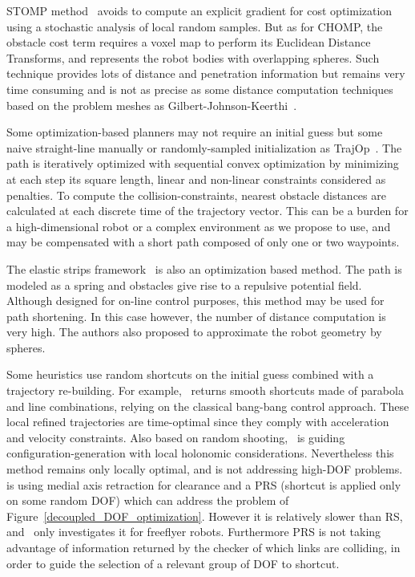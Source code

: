 \documentclass{tADR2e}
\begin{document}
STOMP method~\cite{KalakrishnanStomp} avoids to compute an 
explicit gradient for cost optimization using a stochastic analysis of local 
random samples. But as for CHOMP, the obstacle cost term requires a voxel map to 
perform its Euclidean Distance Transforms, and represents the robot bodies with 
overlapping spheres. Such technique provides lots of distance and penetration 
information but remains very time consuming and is not as precise as some 
distance computation techniques based on the problem meshes as 
Gilbert-Johnson-Keerthi~\cite{gilbertGjk}.

Some optimization-based planners may not require an initial guess but some naive 
straight-line manually or randomly-sampled initialization as 
TrajOp~\cite{SchulmanConvexOptim}. The path is iteratively optimized with 
sequential convex optimization by minimizing at each step its square length, 
linear and non-linear constraints considered as penalties. To compute the 
collision-constraints, nearest obstacle distances are calculated at each discrete 
time of the trajectory vector. This can be a burden for a high-dimensional robot 
or a complex environment as we propose to use, and may be compensated with a 
short path composed of only one or two waypoints.


The elastic strips framework~\cite{BrockElasticStrips} is also an optimization 
based method. The path is modeled as a spring and obstacles give rise to a 
repulsive potential field. Although designed for on-line control purposes, this 
method may be used for path shortening. In this case however, the number of 
distance computation is very high. The authors also proposed to approximate the 
robot geometry by spheres.

Some heuristics use random shortcuts on the initial guess combined with a 
trajectory re-building. For example,~\cite{HauserFastSmooth} returns smooth shortcuts made of parabola and line combinations, relying on the classical bang-bang control approach. These local refined trajectories 
are time-optimal since they comply with acceleration and velocity constraints. 
Also based on random shooting,~\cite{Guernane2011} is guiding 
configuration-generation with local holonomic considerations. 
Nevertheless this method remains only 
locally optimal, and is not addressing high-DOF 
problems.~\cite{GeraertsIJRR07} is 
using medial axis retraction for clearance and a PRS (shortcut is applied only 
on some random DOF) 
which can address the problem of Figure~\ref{decoupled_DOF_optimization}. 
However it is 
relatively slower than RS, and~\cite{GeraertsIJRR07} only investigates 
it for freeflyer robots. 
Furthermore PRS is not taking advantage of information returned by 
the checker of which links are colliding, in order to guide the selection of a relevant group of DOF to shortcut.
\end{document}
